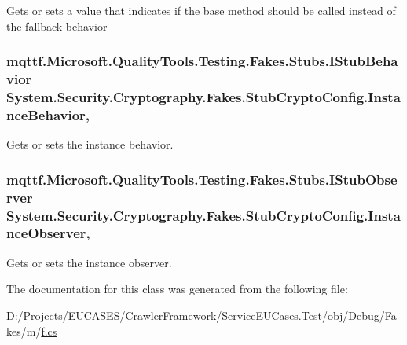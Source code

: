 Gets or sets a value that indicates if the base method should be called instead of the fallback behavior

\hypertarget{class_system_1_1_security_1_1_cryptography_1_1_fakes_1_1_stub_crypto_config_a7c42fa758a4d5f1720a7078f36997691}{
\subsubsection[{Instance\-Behavior}]{\setlength{\rightskip}{0pt plus 5cm}mqttf.\-Microsoft.\-Quality\-Tools.\-Testing.\-Fakes.\-Stubs.\-I\-Stub\-Behavior System.\-Security.\-Cryptography.\-Fakes.\-Stub\-Crypto\-Config.\-Instance\-Behavior\hspace{0.3cm}{\ttfamily [get]}, {\ttfamily [set]}}}\label{class_system_1_1_security_1_1_cryptography_1_1_fakes_1_1_stub_crypto_config_a7c42fa758a4d5f1720a7078f36997691}


Gets or sets the instance behavior.

\hypertarget{class_system_1_1_security_1_1_cryptography_1_1_fakes_1_1_stub_crypto_config_af5a1650f7d03de7abd7d1d4331c77184}{
\subsubsection[{Instance\-Observer}]{\setlength{\rightskip}{0pt plus 5cm}mqttf.\-Microsoft.\-Quality\-Tools.\-Testing.\-Fakes.\-Stubs.\-I\-Stub\-Observer System.\-Security.\-Cryptography.\-Fakes.\-Stub\-Crypto\-Config.\-Instance\-Observer\hspace{0.3cm}{\ttfamily [get]}, {\ttfamily [set]}}}\label{class_system_1_1_security_1_1_cryptography_1_1_fakes_1_1_stub_crypto_config_af5a1650f7d03de7abd7d1d4331c77184}


Gets or sets the instance observer.



The documentation for this class was generated from the following file\-:\begin{DoxyCompactItemize}
\item 
D\-:/\-Projects/\-E\-U\-C\-A\-S\-E\-S/\-Crawler\-Framework/\-Service\-E\-U\-Cases.\-Test/obj/\-Debug/\-Fakes/m/\hyperlink{m_2f_8cs}{f.\-cs}\end{DoxyCompactItemize}
